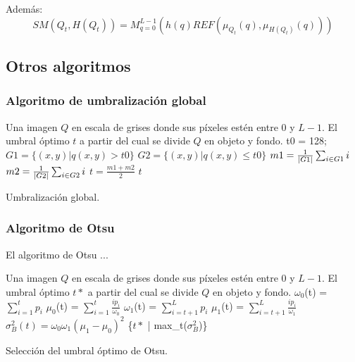 Además:
$$SM(Q_t, H(Q_t)) = M^{L-1}_{q=0}(h(q)REF(\mu_{Q_t}(q), \mu_{H(Q_t)}(q)))$$


\subsection{Otros algoritmos}
\subsubsection{Algoritmo de umbralización global}
\begin{algorithm}
\begin{algorithmic}[1]
\REQUIRE Una imagen $Q$ en escala de grises donde sus píxeles estén entre $0$ y $L-1$.
\ENSURE El umbral óptimo $t$ a partir del cual se divide $Q$ en objeto y fondo.
\STATE t0 = 128; 
\REPEAT
\STATE $G1 = \{(x, y) | q(x, y) > t0\}$
\STATE $G2 = \{(x, y) | q(x, y) \leq t0\}$
\STATE $m1 = \frac{1}{\left\vert G1\right\vert} \sum_{i\in G1} i$
\STATE $m2 = \frac{1}{\left\vert G2\right\vert} \sum_{i\in G2} i$
\STATE $t = \frac{m1+m2}{2}$
\RETURN $t$
\end{algorithmic}
\caption{Umbralización global.}\label{alg:global}
\end{algorithm}


\subsubsection{Algoritmo de Otsu}

El algoritmo de Otsu \cite{art:otsu}...

\begin{algorithm}
\begin{algorithmic}[1]
\REQUIRE Una imagen $Q$ en escala de grises donde sus píxeles estén entre $0$ y $L-1$.
\ENSURE El umbral óptimo $t*$ a partir del cual se divide $Q$ en objeto y fondo.
\STATE $\omega_0$(t) = $\sum_{i=1}^{t}p_i$
\STATE $\mu_0$(t) = $\sum_{i=1}^t \frac{ip_i}{\omega_0}$
\STATE $\omega_1$(t) = $\sum_{i=t+1}^{L}p_i$
\STATE $\mu_1$(t) = $\sum_{i=t+1}^L \frac{ip_i}{\omega_1}$
\STATE $\sigma_B^2(t) = \omega_0\omega_1(\mu_1-\mu_0)^2$
\ENDFOR
\RETURN \{$t*$ | max_t($\sigma_B^2$)\}
\end{algorithmic}
\caption{Selección del umbral óptimo de Otsu.}\label{alg:otsu}
\end{algorithm}

